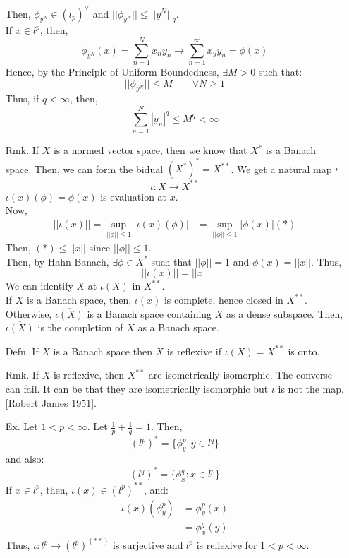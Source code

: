 \documentclass[12pt]{article}
\begin{document}
\begin{itemize}
    Then, $\phi_{y^N} \in (l_p)^\vee$ and $||\phi_{y^N}|| \leq ||y^N||_q$. \\
    If $x \in l^p$, then,
    \[\phi_{y^N}(x) = \sum_{n=1}^N x_ny_n \to \sum_{n=1}^\infty x_yy_n = \phi(x) \]
    Hence, by the Principle of Uniform Boundedness, $\exists M > 0$ such that:
    \[ ||\phi_{y^N}|| \leq M  \qquad \forall N \geq 1\]
    Thus, if $q < \infty$, then, 
    \[ \sum_{n=1}^N |y_n|^q \leq M^q < \infty \]
    \item[Rmk.] If $X$ is a normed vector space, then we know that $X^*$ is a Banach space. Then, we can form the bidual $(X^*)^* = X^{**}$. We get a natural map $\iota$
    \[ \iota: X \to X^{**}\]
    $\iota(x)(\phi) = \phi(x)$ is evaluation at $x$. \\
    Now, 
    \begin{align*}
        ||\iota(x)|| = \sup_{||\phi||\leq 1} | \iota(x)(\phi)|
        &= \sup_{||\phi||\leq 1} |\phi(x)|  (*)
    \end{align*}
    Then, $(*) \leq ||x||$ since $||\phi||\leq 1$. \\
    Then, by Hahn-Banach, $\exists \phi \in X^*$ such that $||\phi|| = 1$ and $\phi(x) = ||x||$. Thus, 
    \[||\iota(x)|| = ||x||\]
    We can identify $X$ at $\iota(X)$ in $X^{**}$. \\
    If $X$ is a Banach space, then, $\iota(x)$ is complete, hence closed in $X^{**}$. \\
    Otherwise, $\overline{\iota(X)}$ is a Banach space containing $X$ as a dense subspace. Then, $\overline{\iota(X)}$ is the completion of $X$ as a Banach space. 
    \item[Defn.] If $X$ is a Banach space then $X$ is reflexive if $\iota(X) = X^{**}$ is onto. 
    \item[Rmk.] If $X$ is reflexive, then $X^{**}$ are isometrically isomorphic. The converse can fail. It can be that they are isometrically isomorphic but $\iota$ is not the map. [Robert James 1951].
    \item[Ex.] Let $1 < p < \infty$. Let $\frac{1}{p} + \frac{1}{q} = 1$. Then,
    \[ (l^p)^{*} = \{\phi_y^p : y \in l^q\} \] 
    and also:
    \[ (l^q)^{*} = \{\phi_x^q : x \in l^p\} \]
    If $x \in l^p$, then, $\iota(x) \in (l^p)^{**}$, and:
    \begin{align*}
        \iota(x)(\phi_y^p) &= \phi_y^p(x) \\
        &= \phi_x^q(y)
    \end{align*}  
    Thus, $\iota: l^p \to (l^p)^(**)$ is surjective and $l^p$ is reflexive for $1 < p < \infty$.

\end{itemize}
\end{document}
